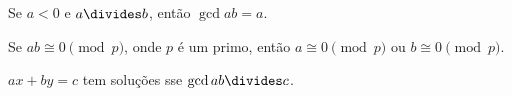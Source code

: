 \begin{exercise}
	Se $a < 0$ e $a\divides b$, então $\gcd a b = a$.
\end{exercise}

\begin{exercise}
	Se $ab\cong 0\pmod p$, onde $p$ é um primo, então $a\cong 0\pmod p$ ou $b\cong 0\pmod p$.
\end{exercise}

\begin{exercise}
	$ax + by = c$ tem soluções sse $\gcd a b\divides c$.
\end{exercise}


